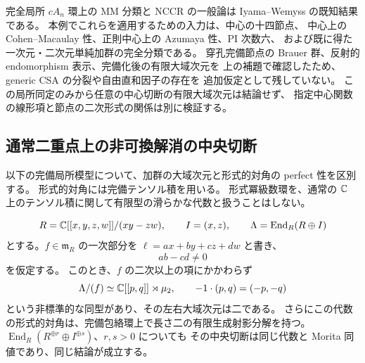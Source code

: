 \begin{remark}[用いた既知結果と本例に固有の入力]
完全局所 $cA_n$ 環上の MM 分類と NCCR の一般論は
Iyama--Wemyss の既知結果である。
本例でこれらを適用するための入力は、中心の十四節点、
中心上の Cohen--Macaulay 性、正則中心上の Azumaya 性、PI 次数六、
および既に得た一次元・二次元単純加群の完全分類である。
穿孔完備節点の Brauer 群、反射的 endomorphism 表示、完備化後の有限大域次元を
上の補題で確認したため、generic CSA の分裂や自由直和因子の存在を
追加仮定として残していない。
この局所同定のみから任意の中心切断の有限大域次元は結論せず、
指定中心関数の線形項と節点の二次形式の関係は別に検証する。
\end{remark}


\subsection{通常二重点上の非可換解消の中央切断}
\label{cmo:subsec:conifold-slice}

以下の完備局所模型について、加群の大域次元と形式的対角の perfect 性を区別する。
形式的対角には完備テンソル積を用いる。
形式冪級数環を、通常の $\mathbb C$ 上のテンソル積に関して有限型の滑らかな代数と扱うことはしない。

\begin{proposition}[非等方な中央切断]
\label{cmo:prop:conifold-nonisotropic-slice}
\[
 R=\mathbb C[[x,y,z,w]]/(xy-zw),\qquad
 I=(x,z),\qquad \Lambda=\operatorname{End}_R(R\oplus I)
\]
とする。$f\in\mathfrak m_R$ の一次部分を
$\ell=a x+b y+c z+d w$ と書き、
\begin{equation}\label{cmo:eq:conifold-dual-nonisotropic}
 ab-cd\ne0
\end{equation}
を仮定する。
このとき、$f$ の二次以上の項にかかわらず
\[
 \Lambda/(f)\simeq\mathbb C[[p,q]]\rtimes\mu_2,
 \qquad -1\cdot(p,q)=(-p,-q)
\]
という非標準的な同型があり、その左右大域次元は二である。
さらにこの代数の形式的対角は、完備包絡環上で長さ二の有限生成射影分解を持つ。
$\operatorname{End}_R(R^{\oplus r}\oplus I^{\oplus s})$、$r,s>0$ についても
その中央切断は同じ代数と Morita 同値であり、同じ結論が成立する。
\end{proposition}


